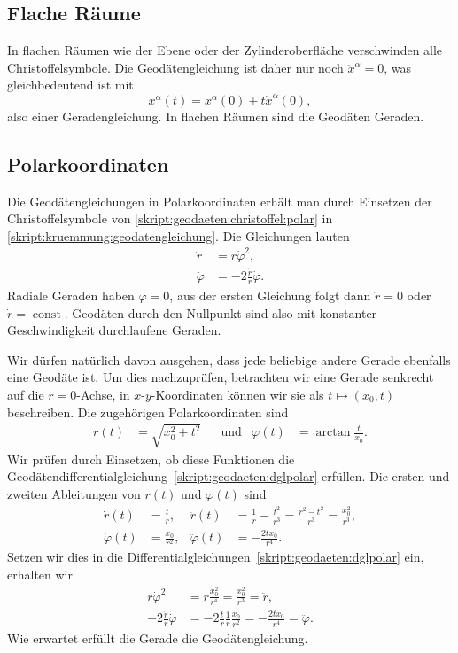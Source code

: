 \subsection{Flache Räume}
In flachen Räumen wie der Ebene oder der Zylinderoberfläche verschwinden
alle Christoffelsymbole.
Die Geodätengleichung ist daher nur noch
$\ddot x^\alpha=0$, was gleichbedeutend ist mit
\[
x^\alpha(t)=x^\alpha(0) + t \dot x^\alpha(0),
\]
also einer Geradengleichung.
In flachen Räumen sind die Geodäten Geraden.

\subsection{Polarkoordinaten}
Die Geodätengleichungen in Polarkoordinaten erhält man durch
Einsetzen der Christoffelsymbole von
\eqref{skript:geodaeten:christoffel:polar}
in
\eqref{skript:kruemmung:geodatengleichung}.
Die Gleichungen lauten
\begin{equation}
\begin{aligned}
\ddot r &= r\dot \varphi^2,
\\
\ddot \varphi &= -2\frac{\dot r}{r}\dot\varphi.
\end{aligned}
\label{skript:geodaeten:dglpolar}
\end{equation}
Radiale Geraden haben $\dot\varphi=0$, aus der ersten Gleichung folgt dann
$\ddot r=0$ oder $\dot r=\operatorname{const}$.
Geodäten durch den Nullpunkt sind also mit konstanter Geschwindigkeit
durchlaufene Geraden.

Wir dürfen natürlich davon ausgehen, dass jede beliebige andere Gerade
ebenfalls eine Geodäte ist.
Um dies nachzuprüfen, betrachten wir eine Gerade senkrecht auf die
$r=0$-Achse, in $x$-$y$-Koordinaten können wir sie als
$t\mapsto (x_0,t)$ beschreiben.
Die zugehörigen Polarkoordinaten sind
\[
\begin{aligned}
r(t)&=\sqrt{x_0^2+t^2}
&&\text{und}&
\varphi(t)&=\arctan\frac{t}{x_0}.
\end{aligned}
\]
Wir prüfen durch Einsetzen, ob diese Funktionen die
Geodätendifferentialgleichung~\eqref{skript:geodaeten:dglpolar}
erfüllen.
Die ersten und zweiten Ableitungen von $r(t)$ und $\varphi(t)$ sind
\begin{align*}
\dot r(t)
&=\frac{t}{r},
&
\ddot r(t)
&=
\frac{1}{r}-\frac{t^2}{r^3}
=
\frac{r^2-t^2}{r^3}
=
\frac{x_0^2}{r^3},
\\
\dot\varphi(t)
&=
\frac{x_0}{r^2},
&
\ddot\varphi(t)
&=
-\frac{2tx_0}{r^4}.
\end{align*}
Setzen wir dies in die
Differentialgleichungen~\eqref{skript:geodaeten:dglpolar}
ein, erhalten wir
\begin{align*}
r\dot\varphi^2
&=
r\frac{x_0^2}{r^4}
=
\frac{x_0^2}{r^3}
=
\ddot r,
\\
-2\frac{\dot r}{r}\dot\varphi
&=
-2\frac{t}{r}\frac1{r}\frac{x_0}{r^2}
=
-\frac{2tx_0}{r^4}
=
\ddot\varphi.
\end{align*}
Wie erwartet erfüllt die Gerade die Geodätengleichung.

